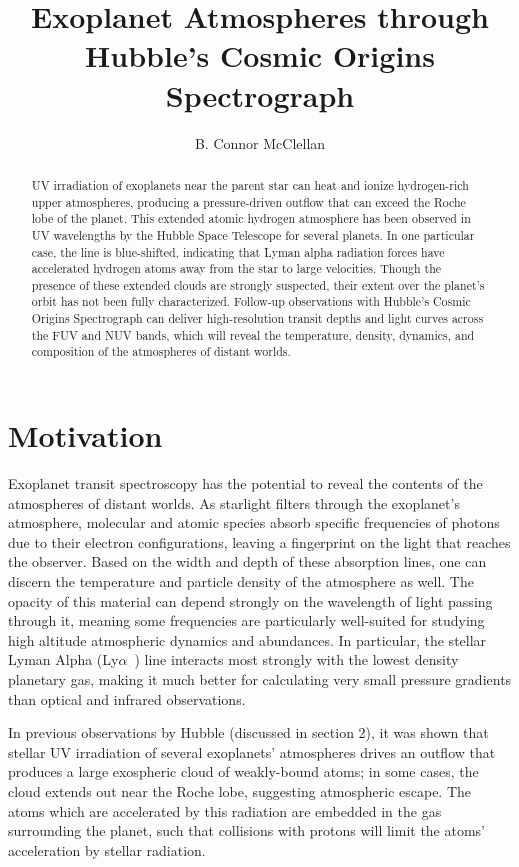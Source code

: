 \documentclass[onecolumn]{aastex63}
\newcommand\lya{Ly$\alpha$\ }
\begin{document}
\title{Exoplanet Atmospheres through Hubble's Cosmic Origins Spectrograph}
\author{B. Connor McClellan}
\keywords{}

\begin{abstract}
    UV irradiation of exoplanets near the parent star can heat and ionize hydrogen-rich upper atmospheres, producing a pressure-driven outflow that can exceed the Roche lobe of the planet. This extended atomic hydrogen atmosphere has been observed in UV wavelengths by the Hubble Space Telescope for several planets. In one particular case, the line is blue-shifted, indicating that Lyman alpha radiation forces have accelerated hydrogen atoms away from the star to large velocities. Though the presence of these extended clouds are strongly suspected, their extent over the planet's orbit has not been fully characterized. Follow-up observations with Hubble's Cosmic Origins Spectrograph can deliver high-resolution transit depths and light curves across the FUV and NUV bands, which will reveal the temperature, density, dynamics, and composition of the atmospheres of distant worlds.
    \vspace{1cm}
\end{abstract}

\section{Motivation}
Exoplanet transit spectroscopy has the potential to reveal the contents of the atmospheres of distant worlds. As starlight filters through the exoplanet's atmosphere, molecular and atomic species absorb specific frequencies of photons due to their electron configurations, leaving a fingerprint on the light that reaches the observer. Based on the width and depth of these absorption lines, one can discern the temperature and particle density of the atmosphere as well. The opacity of this material can depend strongly on the wavelength of light passing through it, meaning some frequencies are particularly well-suited for studying high altitude atmospheric dynamics and abundances. In particular, the stellar Lyman Alpha (\lya) line interacts most strongly with the lowest density planetary gas, making it much better for calculating very small pressure gradients than optical and infrared observations.

In previous observations by Hubble (discussed in section 2), it was shown that stellar UV irradiation of several exoplanets' atmospheres drives an outflow that produces a large exospheric cloud of weakly-bound atoms; in some cases, the cloud extends out near the Roche lobe, suggesting atmospheric escape. The atoms which are accelerated by this radiation are embedded in the gas surrounding the planet, such that collisions with protons will limit the atoms' acceleration by stellar radiation. 
\end{document}
